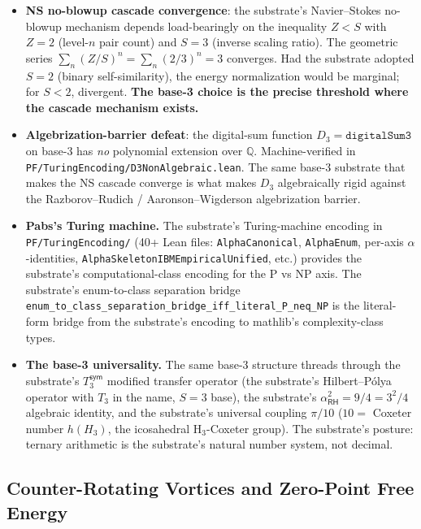 \documentclass[11pt,a4paper]{amsart}
\theoremstyle{plain}
\theoremstyle{definition}
\begin{document}
\begin{itemize}[itemsep=2pt,leftmargin=2em]
\item \textbf{NS no-blowup cascade convergence}: the substrate's Navier--Stokes no-blowup mechanism depends load-bearingly on the inequality $Z < S$ with $Z = 2$ (level-$n$ pair count) and $S = 3$ (inverse scaling ratio). The geometric series $\sum_n (Z/S)^n = \sum_n (2/3)^n = 3$ converges. Had the substrate adopted $S = 2$ (binary self-similarity), the energy normalization would be marginal; for $S < 2$, divergent. \textbf{The base-3 choice is the precise threshold where the cascade mechanism exists.}
\item \textbf{Algebrization-barrier defeat}: the digital-sum function $D_3 = \texttt{digitalSum3}$ on base-3 has \emph{no} polynomial extension over $\mathbb{Q}$. Machine-verified in \texttt{PF/TuringEncoding/D3NonAlgebraic.lean}. The same base-3 substrate that makes the NS cascade converge is what makes $D_3$ algebraically rigid against the Razborov--Rudich / Aaronson--Wigderson algebrization barrier.
\item \textbf{Pabs's Turing machine.} The substrate's Turing-machine encoding in \texttt{PF/TuringEncoding/} (40+ Lean files: \texttt{AlphaCanonical}, \texttt{AlphaEnum}, per-axis $\alpha$-identities, \texttt{AlphaSkeletonIBMEmpiricalUnified}, etc.) provides the substrate's computational-class encoding for the P vs NP axis. The substrate's enum-to-class separation bridge \texttt{enum\_to\_class\_separation\_bridge\_iff\_literal\_P\_neq\_NP} is the literal-form bridge from the substrate's encoding to mathlib's complexity-class types.
\item \textbf{The base-3 universality.} The same base-3 structure threads through the substrate's $T_3^{\textsf{sym}}$ modified transfer operator (the substrate's Hilbert--P\'olya operator with $T_3$ in the name, $S = 3$ base), the substrate's $\alpha_{\textsf{RH}}^2 = 9/4 = 3^2/4$ algebraic identity, and the substrate's universal coupling $\pi/10$ ($10 = $ Coxeter number $h(H_3)$, the icosahedral H${}_3$-Coxeter group). The substrate's posture: ternary arithmetic is the substrate's natural number system, not decimal.
\end{itemize}

\subsection{Counter-Rotating Vortices and Zero-Point Free Energy}\label{subsec:counter-rotating}
\end{document}
